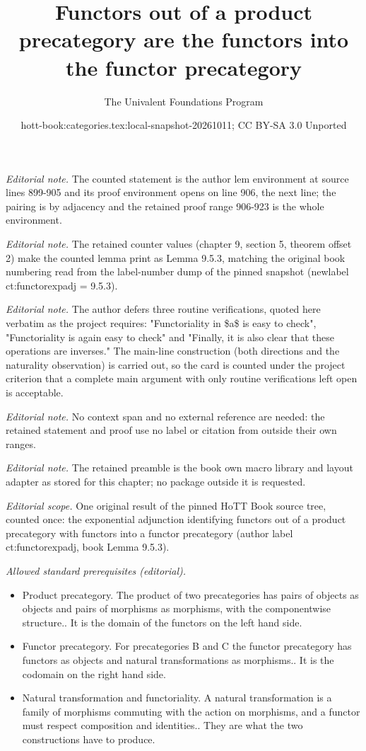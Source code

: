 \documentclass[10pt,a4paper]{article}
\title{Functors out of a product precategory are the functors into the functor precategory}
\author{The Univalent Foundations Program}
\date{hott-book:categories.tex:local-snapshot-20261011; CC BY-SA 3.0 Unported}
\newcounter{chapter}
\theoremstyle{definition}
\theoremstyle{remark}
\numberwithin{equation}{section}
\begin{document}
\maketitle
\setcounter{chapter}{9}
\setcounter{section}{5}
\setcounter{thm}{2}
\noindent\textit{Editorial note.} The counted statement is the author lem environment at source lines 899-905 and its proof environment opens on line 906, the next line; the pairing is by adjacency and the retained proof range 906-923 is the whole environment.\par\medskip
\noindent\textit{Editorial note.} The retained counter values (chapter 9, section 5, theorem offset 2) make the counted lemma print as Lemma 9.5.3, matching the original book numbering read from the label-number dump of the pinned snapshot (newlabel ct:functorexpadj = 9.5.3).\par\medskip
\noindent\textit{Editorial note.} The author defers three routine verifications, quoted here verbatim as the project requires: "Functoriality in \$a\$ is easy to check", "Functoriality is again easy to check" and "Finally, it is also clear that these operations are inverses." The main-line construction (both directions and the naturality observation) is carried out, so the card is counted under the project criterion that a complete main argument with only routine verifications left open is acceptable.\par\medskip
\noindent\textit{Editorial note.} No context span and no external reference are needed: the retained statement and proof use no label or citation from outside their own ranges.\par\medskip
\noindent\textit{Editorial note.} The retained preamble is the book own macro library and layout adapter as stored for this chapter; no package outside it is requested.\par\medskip
\noindent\textit{Editorial scope.} One original result of the pinned HoTT Book source tree, counted once: the exponential adjunction identifying functors out of a product precategory with functors into a functor precategory (author label ct:functorexpadj, book Lemma 9.5.3).\par\medskip
\noindent\textit{Allowed standard prerequisites (editorial).}\begin{itemize}
\item Product precategory. The product of two precategories has pairs of objects as objects and pairs of morphisms as morphisms, with the componentwise structure.. It is the domain of the functors on the left hand side.
\item Functor precategory. For precategories B and C the functor precategory has functors as objects and natural transformations as morphisms.. It is the codomain on the right hand side.
\item Natural transformation and functoriality. A natural transformation is a family of morphisms commuting with the action on morphisms, and a functor must respect composition and identities.. They are what the two constructions have to produce.
\end{itemize}\medskip
\end{document}
